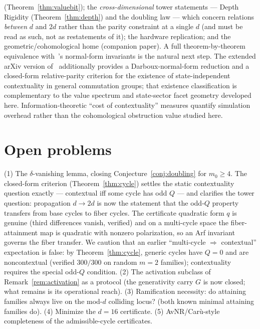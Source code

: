 \documentclass[11pt]{article}
\theoremstyle{remark}
\begin{document}
(Theorem~\ref{thm:valuebit}); the \emph{cross-dimensional} tower statements --- Depth Rigidity
(Theorem~\ref{thm:depth}) and the doubling law --- which concern relations \emph{between} $d$ and $2d$
rather than the parity constraint at a single $d$ (and must be read as such, not as restatements of it);
the hardware replication; and the geometric/cohomological home (companion paper). A full
theorem-by-theorem equivalence with~\cite{ACC24}'s normal-form invariants is the natural next step.
The extended arXiv version of~\cite{ACC24} additionally provides a Darboux-normal-form reduction and
a closed-form relative-parity criterion for the existence of state-independent contextuality in
general commutation groups; that existence classification is complementary to the value spectrum and
state-sector facet geometry developed here. Information-theoretic ``cost of contextuality'' measures
\cite{BookkeepingCost,CoordinationCost} quantify simulation overhead rather than the cohomological
obstruction value studied here.

\section{Open problems}\label{sec:open}
(1) The $\delta$-vanishing lemma, closing Conjecture~\ref{conj:doubling} for $m_0\ge 4$. The
closed-form criterion (Theorem~\ref{thm:cycle}) settles the static contextuality question exactly ---
contextual iff some cycle has odd $Q$ --- and clarifies the tower question: propagation $d\to 2d$ is
now the statement that the odd-$Q$ property transfers from base cycles to fiber cycles. The certificate
quadratic form $q$ is genuine (third differences vanish, verified) and on a multi-cycle space the
fiber-attainment map is quadratic with nonzero polarization, so an Arf invariant governs the fiber
transfer. We caution that an earlier ``multi-cycle $\Rightarrow$ contextual'' expectation is false: by
Theorem~\ref{thm:cycle}, generic cycles have $Q=0$ and are noncontextual (verified $300/300$ on random
$m{=}2$ families); contextuality requires the special odd-$Q$ condition. (2) The activation subclass of
Remark~\ref{rem:activation} as a protocol (the generativity carry $G$ is now closed; what remains is
its operational reach). (3) Ramification necessity: do attaining families always live on the mod-$d$
colliding locus? (both known minimal attaining families do). (4) Minimize the $d=16$ certificate.
(5) AvNR/Car\`u-style completeness of the admissible-cycle certificates.
\end{document}
